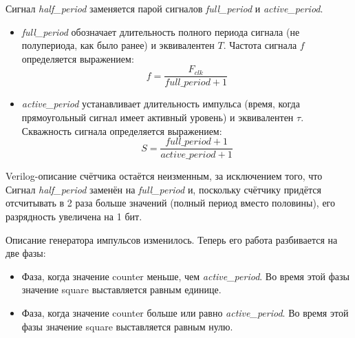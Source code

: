 Сигнал \textit{half\_period} заменяется парой сигналов \textit{full\_period} и \textit{active\_period}. 

\begin{itemize}
\item \textit{full\_period} обозначает длительность полного периода сигнала (не полупериода, как было ранее) и эквивалентен $T$. Частота сигнала $f$ определяется выражением:
$$ f = \frac{F_{clk}}{\textit{full\_period} + 1} $$ 
\item \textit{active\_period} устанавливает длительность импульса (время, когда прямоугольный сигнал имеет активный уровень) и эквивалентен $\tau$. Скважность сигнала определяется выражением:
$$ S = \frac{\textit{full\_period} + 1}{\textit{active\_period} + 1} $$
\end{itemize}


\noindent
\begin{minipage}{\linewidth}
	
\end{minipage}


Verilog-описание счётчика остаётся неизменным, за исключением того, что Сигнал \textit{half\_period} заменён на \textit{full\_period} и, поскольку счётчику придётся отсчитывать в 2 раза больше значений (полный период вместо половины), его разрядность увеличена на 1 бит.

\noindent
\begin{minipage}{\linewidth}
	
\end{minipage}


Описание генератора импульсов изменилось. Теперь его работа разбивается на две фазы:
\begin{itemize}
	\item Фаза, когда значение counter меньше, чем \textit{active\_period}. Во время этой фазы значение square выставляется равным единице.
	\item Фаза, когда значение counter больше или равно \textit{active\_period}. Во время этой фазы значение square выставляется равным нулю.
\end{itemize}

\noindent
\begin{minipage}{\linewidth}
	
\end{minipage}

